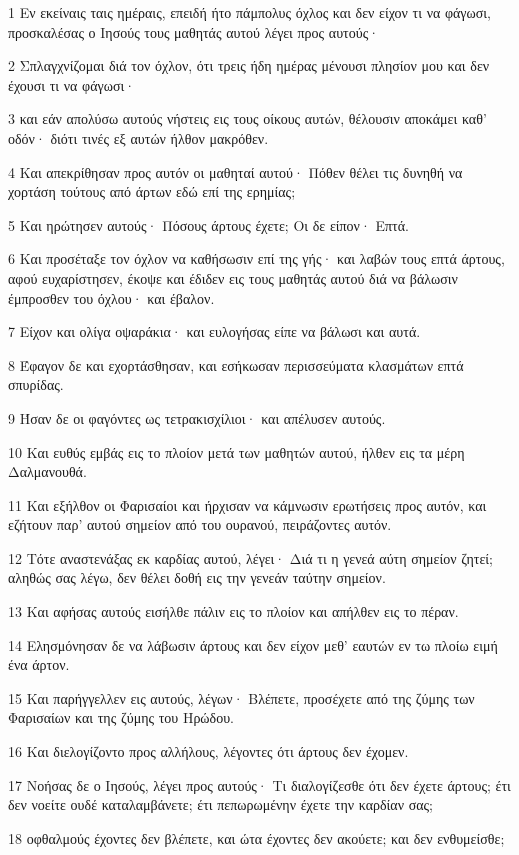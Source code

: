 \par 1 Εν εκείναις ταις ημέραις, επειδή ήτο πάμπολυς όχλος και δεν είχον τι να φάγωσι, προσκαλέσας ο Ιησούς τους μαθητάς αυτού λέγει προς αυτούς·
\par 2 Σπλαγχνίζομαι διά τον όχλον, ότι τρεις ήδη ημέρας μένουσι πλησίον μου και δεν έχουσι τι να φάγωσι·
\par 3 και εάν απολύσω αυτούς νήστεις εις τους οίκους αυτών, θέλουσιν αποκάμει καθ' οδόν· διότι τινές εξ αυτών ήλθον μακρόθεν.
\par 4 Και απεκρίθησαν προς αυτόν οι μαθηταί αυτού· Πόθεν θέλει τις δυνηθή να χορτάση τούτους από άρτων εδώ επί της ερημίας;
\par 5 Και ηρώτησεν αυτούς· Πόσους άρτους έχετε; Οι δε είπον· Επτά.
\par 6 Και προσέταξε τον όχλον να καθήσωσιν επί της γής· και λαβών τους επτά άρτους, αφού ευχαρίστησεν, έκοψε και έδιδεν εις τους μαθητάς αυτού διά να βάλωσιν έμπροσθεν του όχλου· και έβαλον.
\par 7 Είχον και ολίγα οψαράκια· και ευλογήσας είπε να βάλωσι και αυτά.
\par 8 Έφαγον δε και εχορτάσθησαν, και εσήκωσαν περισσεύματα κλασμάτων επτά σπυρίδας.
\par 9 Ήσαν δε οι φαγόντες ως τετρακισχίλιοι· και απέλυσεν αυτούς.
\par 10 Και ευθύς εμβάς εις το πλοίον μετά των μαθητών αυτού, ήλθεν εις τα μέρη Δαλμανουθά.
\par 11 Και εξήλθον οι Φαρισαίοι και ήρχισαν να κάμνωσιν ερωτήσεις προς αυτόν, και εζήτουν παρ' αυτού σημείον από του ουρανού, πειράζοντες αυτόν.
\par 12 Τότε αναστενάξας εκ καρδίας αυτού, λέγει· Διά τι η γενεά αύτη σημείον ζητεί; αληθώς σας λέγω, δεν θέλει δοθή εις την γενεάν ταύτην σημείον.
\par 13 Και αφήσας αυτούς εισήλθε πάλιν εις το πλοίον και απήλθεν εις το πέραν.
\par 14 Ελησμόνησαν δε να λάβωσιν άρτους και δεν είχον μεθ' εαυτών εν τω πλοίω ειμή ένα άρτον.
\par 15 Και παρήγγελλεν εις αυτούς, λέγων· Βλέπετε, προσέχετε από της ζύμης των Φαρισαίων και της ζύμης του Ηρώδου.
\par 16 Και διελογίζοντο προς αλλήλους, λέγοντες ότι άρτους δεν έχομεν.
\par 17 Νοήσας δε ο Ιησούς, λέγει προς αυτούς· Τι διαλογίζεσθε ότι δεν έχετε άρτους; έτι δεν νοείτε ουδέ καταλαμβάνετε; έτι πεπωρωμένην έχετε την καρδίαν σας;
\par 18 οφθαλμούς έχοντες δεν βλέπετε, και ώτα έχοντες δεν ακούετε; και δεν ενθυμείσθε;
